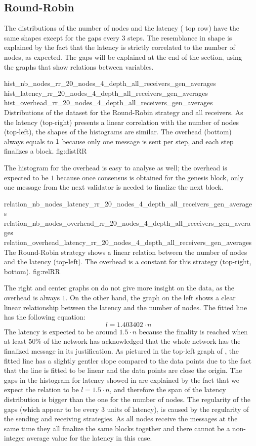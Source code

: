 \subsection{Round-Robin}
\FloatBarrier
The distributions of the number of nodes and the latency
( top row) have the same
shapes except for the gaps every 3 steps. The resemblance in shape is explained
by the fact that the latency is strictly correlated to the number of nodes, as
expected.
The gaps will be explained at the end of the section, using the graphs that show
relations between variables.

\triplefigure
    {hist_nb_nodes_rr_20_nodes_4_depth_all_receivers_gen_averages}
    {hist_latency_rr_20_nodes_4_depth_all_receivers_gen_averages}
    {hist_overhead_rr_20_nodes_4_depth_all_receivers_gen_averages}
    {Distributions of the dataset for the Round-Robin strategy and all
    receivers. As the latency (top-right) presents a linear correlation with the number of
    nodes (top-left), the shapes of the histograms are similar. The overhead
    (bottom) always equals to $\protect 1$ because only one message is sent per step, and each step
    finalizes a block.}
    {fig:distRR}

The histogram for the overhead is easy to analyse as well; the overhead is
expected to be $1$ because once consensus is obtained for the genesis block, only
one message from the next validator is needed to finalize the next block.

\triplefigure
    {relation_nb_nodes_latency_rr_20_nodes_4_depth_all_receivers_gen_averages}
    {relation_nb_nodes_overhead_rr_20_nodes_4_depth_all_receivers_gen_averages}
    {relation_overhead_latency_rr_20_nodes_4_depth_all_receivers_gen_averages}
    {The Round-Robin strategy shows a linear relation between the number of
    nodes and the latency (top-left). The overhead is a constant for this
    strategy (top-right, bottom).}
    {fig:relRR}

The right and center graphs on  do not give more insight on the
data, as the overhead is always \(1\). On the other hand, the graph on the left
shows a clear linear relationship between the latency and the number of nodes.
The fitted line has the following equation:
\[l = 1.403402\cdot n\]
The latency is expected to be around \(1.5\cdot n\) because the finality is
reached when at least 50\% of the network has acknowledged that the whole
network has the finalized message in its justification. As pictured in the
top-left graph of , the fitted line has a slightly gentler
slope compared to the data points due to the fact that the line is fitted to be
linear and the data points are close the origin. 
The gaps in the histogram for latency showed in  are explained by the fact
that we expect the relation to be \(l = 1.5\cdot n\), and therefore the span of
the latency distribution is bigger than the one for the number of nodes. The
regularity of the gaps (which appear to be every 3 units of latency), is caused
by the regularity of the sending and receiving strategies. As all nodes receive
the messages at the same time they all finalize the same blocks together and
there cannot be a non-integer average value for the latency in this case.

